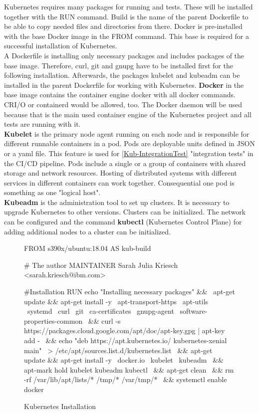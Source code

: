 Kubernetes requires many packages for running and tests. These will be installed together with the RUN command.
Build is the name of the parent Dockerfile to be able to copy needed files and directories from there.
Docker is pre-installed with the base Docker image in the FROM command. This base is required for a successful installation of Kubernetes. \\
A Dockerfile is installing only necessary packages and includes packages of the base image. Therefore, curl, git and gnupg have to be installed first for the following installation.
Afterwards, the packages kubelet and kubeadm can be installed in the parent Dockerfile for working with Kubernetes. \textbf{Docker} in the base image contains the container engine docker with all docker commands. CRI/O or containerd would be allowed, too. 
The Docker daemon will be used because that is the main used container engine of the Kubernetes project and all tests are running with it. \\ 
\textbf{Kubelet} is the primary node agent running on each node and is responsible for different runnable containers in a pod. Pods are deployable units defined in JSON or a yaml file. This feature is used for \ref{Kub-IntegrationTest} "integration tests" in the \gls{CI/CD} pipeline.
Pods include a single or a group of containers with shared storage and network resources. Hosting of distributed systems  with different services in different containers can work together. Consequential one pod is something as one "logical host". \\
\textbf{Kubeadm} is the administration tool to set up clusters. It is necessary to upgrade Kubernetes to other versions. Clusters can be initialized. The network can be configured and the command \textbf{kubectl} (Kubernetes Control Plane) for adding additional nodes to a cluster can be initialized. 

\begin{figure}[H]
\centering
\begin{boxedverbatim}
FROM s390x/ubuntu:18.04 AS kub-build
 
# The author
MAINTAINER Sarah Julia Kriesch <sarah.kriesch@ibm.com>

#Installation
RUN echo "Installing necessary packages" && \
apt-get update && apt-get install -y \
apt-transport-https \
apt-utils \
systemd \
curl \
git \
ca-certificates \
gnupg-agent \
software-properties-common \
&& curl -s https://packages.cloud.google.com/apt/doc/apt-key.gpg | apt-key add - \
&& echo "deb https://apt.kubernetes.io/ kubernetes-xenial main" \
> /etc/apt/sources.list.d/kubernetes.list \
&& apt-get update && apt-get install -y \
docker.io \
kubelet \
kubeadm \
&& apt-mark hold kubelet kubeadm kubectl \
&& apt-get clean \
&& rm -rf /var/lib/apt/lists/* /tmp/* /var/tmp/* \
&& systemctl enable docker 
\end{boxedverbatim}
 \caption{Kubernetes Installation}
    \label{kubernetes-installation}
\end{figure}

